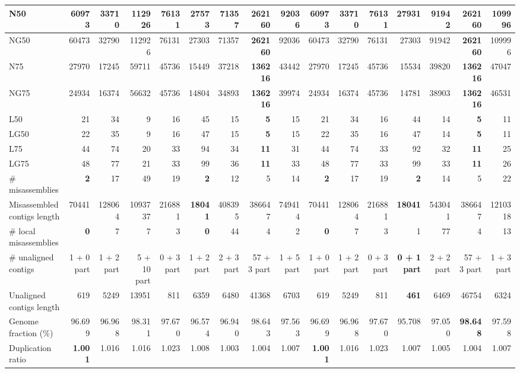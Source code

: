 \documentclass[12pt,a4paper]{article}
\begin{document}
\begin{table}[ht]
\begin{center}
\begin{tabular}{|l*{15}{|r}|}
N50 & 60973 & 33710 & 112926 & 76131 & 27573 & 71357 & {\bf 262160} & 92036 & 60973 & 33710 & 76131 & 27931 & 91942 & {\bf 262160} & 109996 \\ \hline
NG50 & 60473 & 32790 & 112926 & 76131 & 27303 & 71357 & {\bf 262160} & 92036 & 60473 & 32790 & 76131 & 27303 & 91942 & {\bf 262160} & 109996 \\ \hline
N75 & 27970 & 17245 & 59711 & 45736 & 15449 & 37218 & {\bf 136216} & 43442 & 27970 & 17245 & 45736 & 15534 & 39820 & {\bf 136216} & 47047 \\ \hline
NG75 & 24934 & 16374 & 56632 & 45736 & 14804 & 34893 & {\bf 136216} & 39974 & 24934 & 16374 & 45736 & 14781 & 38903 & {\bf 136216} & 46531 \\ \hline
L50 & 21 & 34 & 9 & 16 & 45 & 15 & {\bf 5} & 15 & 21 & 34 & 16 & 44 & 14 & {\bf 5} & 11 \\ \hline
LG50 & 22 & 35 & 9 & 16 & 47 & 15 & {\bf 5} & 15 & 22 & 35 & 16 & 47 & 14 & {\bf 5} & 11 \\ \hline
L75 & 44 & 74 & 20 & 33 & 94 & 34 & {\bf 11} & 31 & 44 & 74 & 33 & 92 & 32 & {\bf 11} & 25 \\ \hline
LG75 & 48 & 77 & 21 & 33 & 99 & 36 & {\bf 11} & 33 & 48 & 77 & 33 & 99 & 33 & {\bf 11} & 26 \\ \hline
\# misassemblies & {\bf 2} & 17 & 49 & 19 & {\bf 2} & 12 & 5 & 14 & {\bf 2} & 17 & 19 & {\bf 2} & 14 & 5 & 22 \\ \hline
Misassembled contigs length & 70441 & 128064 & 1093737 & 216881 & {\bf 18041} & 408395 & 386647 & 749414 & 70441 & 128064 & 216881 & {\bf 18041} & 543041 & 386647 & 1210318 \\ \hline
\# local misassemblies & {\bf 0} & 7 & 7 & 3 & {\bf 0} & 44 & 4 & 2 & {\bf 0} & 7 & 3 & 1 & 77 & 4 & 13 \\ \hline
\# unaligned contigs & 1 + 0 part & 1 + 2 part & 5 + 10 part & 0 + 3 part & 1 + 2 part & 2 + 3 part & 57 + 3 part & 1 + 5 part & 1 + 0 part & 1 + 2 part & 0 + 3 part & {\bf 0 + 1 part} & 2 + 2 part & 57 + 3 part & 1 + 3 part \\ \hline
Unaligned contigs length & 619 & 5249 & 13951 & 811 & 6359 & 6480 & 41368 & 6703 & 619 & 5249 & 811 & {\bf 461} & 6469 & 46754 & 6324 \\ \hline
Genome fraction (\%) & 96.699 & 96.968 & 98.311 & 97.670 & 96.574 & 96.940 & 98.643 & 97.563 & 96.699 & 96.968 & 97.670 & 95.708 & 97.050 & {\bf 98.648} & 97.598 \\ \hline
Duplication ratio & {\bf 1.001} & 1.016 & 1.016 & 1.023 & 1.008 & 1.003 & 1.004 & 1.007 & {\bf 1.001} & 1.016 & 1.023 & 1.007 & 1.005 & 1.004 & 1.007 \\ \hline

\end{tabular}
\end{center}
\end{table}
\end{document}
